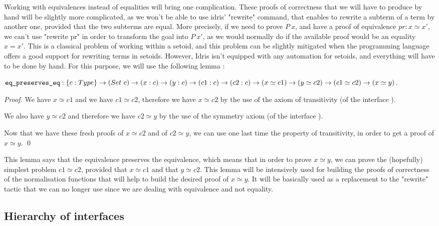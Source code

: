 Working with equivalences instead of equalities will bring one complication. These proofs of correctness that we will have to produce by hand will be slightly more complicated, as we won't be able to use idris' "rewrite" command, that enables to rewrite a subterm of a term by another one, provided that the two subterms are equal. More precisely, if we need to prove $P\ x$, and have a proof of equivalence $pr:x \simeq x'$, we can't use "rewrite pr" in order to transform the goal into $P\ x'$, as we would normally do if the available proof would be an equality $x=x'$. This is a classical problem of working within a setoid, and this problem can be slightly mitigated when the programming language offers a good support for rewriting terms in setoids. However, Idris isn't equipped with any automation for setoids, and everything will have to be done by hand. For this purpose, we will use the following lemma :

${\mbox{\texttt{eq\_preserves\_eq}}} : \{c:Type\} \rightarrow (Set\ c) \rightarrow (x:c) \rightarrow (y:c) \rightarrow (c1:c) \rightarrow (c2:c) \rightarrow (x \simeq c1) \rightarrow (y \simeq c2) \rightarrow (c1 \simeq c2) \rightarrow (x \simeq y)$.

\begin{proof}
We have $x \simeq c1$ and we have $c1 \simeq c2$, therefore we have $x \simeq c2$ by the use of the axiom of transitivity (of the interface ). \

We also have $y \simeq c2$ and therefore we have $c2 \simeq y$ by the use of the symmetry axiom (of the interface ). \

Now that we have these fresh proofs of $x \simeq c2$ and of $c2 \simeq y$, we can use one last time the property of transitivity, in order to get a proof of $x \simeq y$.
\qed
\end{proof}

This lemma says that the equivalence preserves the equivalence, which means that in order to prove $x \simeq y$, we can prove the (hopefully) simplest problem $c1 \simeq c2$, provided that $x \simeq c1$ and that $y \simeq c2$. This lemma will be intensively used for building the proofs of correctness of the normalisation functions that will help to build the desired proof of $x \simeq y$. It will be basically used as a replacement to the "rewrite" tactic that we can no longer use since we are dealing with equivalence and not equality.

		\subsection{Hierarchy of interfaces}

